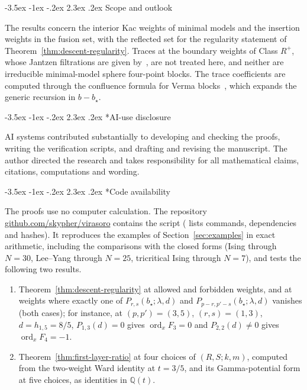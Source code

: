 \documentclass[twoside,10pt]{article}
\makeatletter
\numberwithin{equation}{section}
\theoremstyle{slbody}
\theoremstyle{definition}
\theoremstyle{remark}
\newcommand{\ord}{\operatorname{ord}}
\renewcommand{\section}{%
  \@startsection{section}{1}{\z@}%
    {-3.5ex \@plus -1ex \@minus -.2ex}%
    {2.3ex \@plus .2ex}%
    {\normalfont\large\bfseries}}
\makeatother
\begin{document}
\section{Scope and outlook}\label{sec:scope}

The results concern the interior Kac weights of minimal models and the
insertion weights in the fusion set, with the reflected set for the
regularity statement of Theorem~\ref{thm:descent-regularity}.  Traces at the
boundary weights of Class \(R^+\), whose Jantzen filtrations are given
by~\cite[Theorem~6.3(ii)--(iv) and (6.4)]{IoharaKoga2011}, are not treated
here, and neither are irreducible minimal-model sphere four-point blocks.
The trace coefficients are computed through the confluence formula for Verma
blocks~\cite[Theorem~7.3]{PolzerColliding2026}, which
expands the generic recursion in \(b-b_\star\).

\section*{AI-use disclosure}

AI systems contributed substantially to developing and checking the
proofs, writing the verification scripts, and drafting and revising the
manuscript. The author directed the research and takes responsibility
for all mathematical claims, citations, computations and wording.

\section*{Code availability}

The proofs use no computer calculation.  The repository
\href{https://github.com/skypher/virasoro}{github.com/skypher/virasoro}
contains the script 
( lists commands, dependencies and hashes).  It
reproduces the examples of Section~\ref{sec:examples} in exact arithmetic,
including the comparisons with the closed forms (Ising through \(N=30\),
Lee--Yang through \(N=25\), tricritical Ising through \(N=7\)), and tests the
following two results.
\begin{enumerate}
 \item Theorem~\ref{thm:descent-regularity} at allowed and forbidden weights,
   and at weights where exactly one of \(P_{r,s}(b_\star;\lambda,d)\) and
   \(P_{p-r,p'-s}(b_\star;\lambda,d)\) vanishes (both cases); for instance, at \((p,p')=(3,5)\),
   \((r,s)=(1,3)\), \(d=h_{1,5}=8/5\), \(P_{1,3}(d)=0\) gives \(\ord_xF_3=0\)
   and \(P_{2,2}(d)\neq0\) gives \(\ord_xF_4=-1\).
 \item Theorem~\ref{thm:first-layer-ratio} at four choices of
   \((R,S;k,m)\), computed from the two-weight Ward identity at \(t=3/5\),
   and its Gamma-potential form at five choices, as identities in
   \(\mathbb{Q}(t)\).
\end{enumerate}
\end{document}
